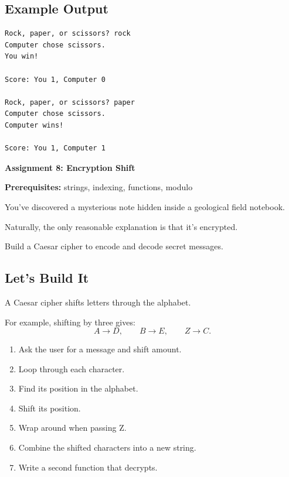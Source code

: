 \documentclass[11pt,letterpaper]{article}
\newcommand{\assignment}[3]{
    \clearpage
    {\Large\bfseries\color{navy} Assignment #1: #2}

    \vspace{2mm}
    {\small\color{darkgray}\textbf{Prerequisites:} #3}

    \vspace{3mm}
}
\newcommand{\steps}{\subsection*{Let's Build It}}
\newcommand{\exampleoutput}{\subsection*{Example Output}}
\begin{document}
\exampleoutput

\begin{lstlisting}[style=outputstyle]
Rock, paper, or scissors? rock
Computer chose scissors.
You win!

Score: You 1, Computer 0

Rock, paper, or scissors? paper
Computer chose scissors.
Computer wins!

Score: You 1, Computer 1
\end{lstlisting}

\assignment{8}{Encryption Shift}
{strings, indexing, functions, modulo}

\begin{missionbox}
You've discovered a mysterious note hidden inside a geological field notebook.

Naturally, the only reasonable explanation is that it's encrypted.

Build a Caesar cipher to encode and decode secret messages.
\end{missionbox}

\steps

A Caesar cipher shifts letters through the alphabet.

For example, shifting by three gives:
\[
A\rightarrow D,\qquad
B\rightarrow E,\qquad
Z\rightarrow C.
\]

\begin{enumerate}
    \item Ask the user for a message and shift amount.
    \item Loop through each character.
    \item Find its position in the alphabet.
    \item Shift its position.
    \item Wrap around when passing Z.
    \item Combine the shifted characters into a
    new string.
    \item Write a second function that decrypts.
\end{enumerate}
\end{document}
